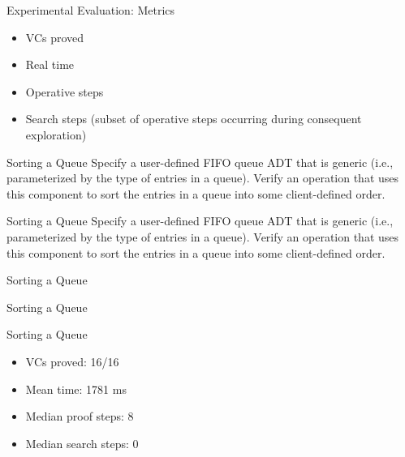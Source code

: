 \begin{frame}{Experimental Evaluation: Metrics}
	\begin{itemize}
		\item VCs proved
		\item Real time
		\item Operative steps
		\item Search steps (subset of operative steps occurring during consequent exploration)
	\end{itemize}
\end{frame}


\begin{frame}{Sorting a Queue}
	Specify a user-defined FIFO queue ADT that is generic (i.e., parameterized by the type of entries in a queue). Verify an operation that uses this component to sort the entries in a queue into some client-defined order.
	\vspace{2em}
	
\end{frame}


\begin{frame}{Sorting a Queue}
	Specify a user-defined FIFO queue ADT that is generic (i.e., parameterized by the type of entries in a queue). Verify an operation that uses this component to sort the entries in a queue into some client-defined order.
	\vspace{2em}
	
\end{frame}


\begin{frame}{Sorting a Queue}
	
\end{frame}


\begin{frame}{Sorting a Queue}
	
\end{frame}


\begin{frame}{Sorting a Queue}
	\begin{itemize}
		\item VCs proved: 16/16
		\item Mean time: 1781 ms
		\item Median proof steps: 8
		\item Median search steps: 0
	\end{itemize}
\end{frame}


